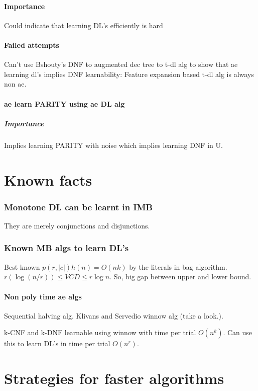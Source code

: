 \documentclass[10pt]{amsart}
\begin{document}
\subsection{Importance}
Could indicate that learning DL's efficiently is hard

\subsection{Failed attempts}
Can't use Bshouty's DNF to augmented dec tree to t-dl alg to show that ae learning dl's implies DNF learnability: Feature expansion based t-dl alg is always non ae.

\subsection{ae learn PARITY using ae DL alg}

\subsubsection{Importance}
Implies learning PARITY with noise which implies learning DNF in U.

\part{Known facts}
\section{Monotone DL can be learnt in IMB}
They are merely conjunctions and disjunctions.

\section{Known MB algs to learn DL's}
Best known $p(r, |c|)h(n) = O(nk)$ by the literals in bag algorithm. $r(\log (n/r))\leq VCD \leq r \log n$. So, big gap between upper and lower bound.

\subsection{Non poly time ae algs}
Sequential halving alg. Klivans and Servedio winnow alg (take a look.).

k-CNF and k-DNF learnable using winnow with time per trial $O(n^{k})$. Can use this to learn DL's in time per trial $O(n^{r})$.

\part{Strategies for faster algorithms}
\end{document}
